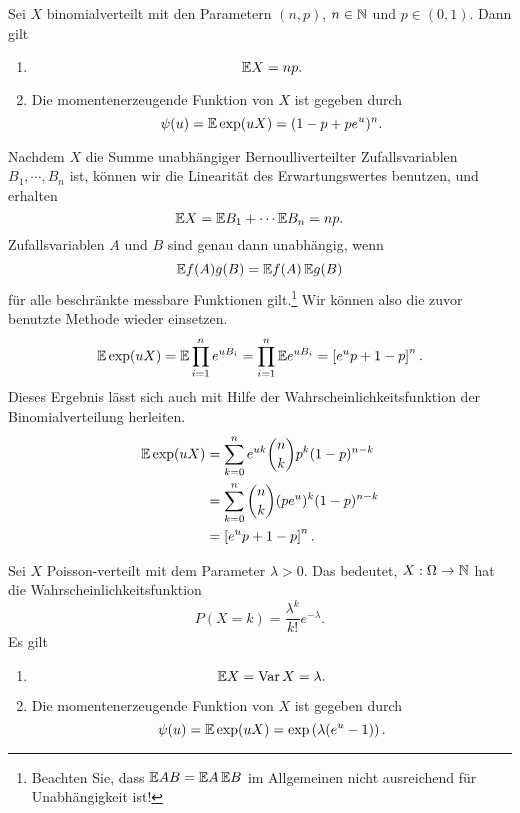 Sei $X$ binomialverteilt mit den Parametern $(n,p)$, $n\in\mathbb{N}$ und $p\in(0,1)$. Dann gilt
\begin{enumerate}
    \item \begin{equation*}
            \mathbb{E} X = np. 
        \end{equation*}
    \item Die momentenerzeugende Funktion von $X$ ist gegeben durch
        \begin{equation*}
            \psi(u) = \mathbb{E} \exp( uX) = (1 -p + p e^u)^{n}.
        \end{equation*}
\end{enumerate}
\solution
Nachdem $X$ die Summe unabhängiger Bernoulliverteilter Zufallsvariablen $B_1,
\cdots, B_n$ ist, können wir die Linearität des Erwartungswertes benutzen, und
erhalten
\begin{equation*}
    \mathbb{E} X = \mathbb{E} B_1 + \cdots \mathbb{E} B_n = np. 
\end{equation*}
Zufallsvariablen $A$ und $B$ sind genau dann unabhängig, wenn 
\begin{equation*}
    \mathbb{E} f(A)g(B) = \mathbb{E} f(A)\, \mathbb{E} g(B)
\end{equation*}
für alle beschränkte messbare Funktionen gilt.\footnote{Beachten Sie, dass $\mathbb{E}
AB = \mathbb{E} A\, \mathbb{E} B$ im Allgemeinen nicht ausreichend für Unabhängigkeit ist!}
Wir können also die zuvor benutzte Methode wieder einsetzen. 
\begin{equation*}
    \mathbb{E} \exp (u X) = \mathbb{E} \prod_{i=1}^{n} e^{u B_i} 
    = \prod_{i=1}^{n} \mathbb{E} e^{u B_i} 
    = \left[ e^{u}p + 1 -p \right]^{n}.
\end{equation*}
Dieses Ergebnis lässt sich auch mit Hilfe der Wahrscheinlichkeitsfunktion der 
Binomialverteilung herleiten. 
\begin{align*}
    \mathbb{E} \exp (u X) &= \sum_{k=0}^{n} e^{u k} \binom{n}{k} p^{k}(1-p)^{n-k} \\
    &= \sum_{k=0}^{n} \binom{n}{k} (p e^{u})^{k}(1-p)^{n-k} \\
    &= \left[ e^u p + 1-p \right]^n.
\end{align*}

Sei $X$ Poisson-verteilt mit dem Parameter $\lambda>0$. Das bedeutet, $X:\Omega\to\mathbb N$
hat die Wahrscheinlichkeitsfunktion 
\begin{equation*}
    P(X = k) = \frac{\lambda^{k}}{k!} e^{-\lambda}.
\end{equation*}
Es gilt
\begin{enumerate}
    \item 
        \begin{equation*}
            \mathbb{E} X = \operatorname{Var} X = \lambda.
        \end{equation*}
    \item Die momentenerzeugende Funktion von $X$ ist gegeben durch
        \begin{equation*}
            \psi(u) = \mathbb{E} \exp(uX) = \exp \left( \lambda(e^u - 1) \right).
        \end{equation*}
\end{enumerate}

